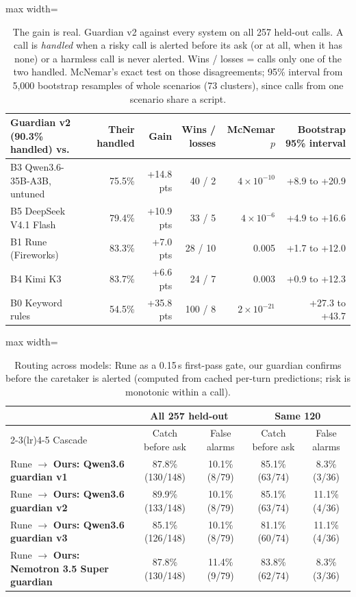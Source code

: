 \documentclass[11pt]{article}
\begin{document}
\begin{table}[H]\centering\small
\caption{The gain is real. Guardian v2 against every system on all 257 held-out calls. A call is \emph{handled} when a risky call is alerted before its ask (or at all, when it has none) or a harmless call is never alerted. Wins / losses = calls only one of the two handled. McNemar's exact test on those disagreements; 95\% interval from 5,000 bootstrap resamples of whole scenarios (73 clusters), since calls from one scenario share a script.}\label{tab:sig}
\begin{adjustbox}{max width=\linewidth}\begin{tabular}{lrrrrr}\toprule
Guardian v2 (90.3\% handled) vs. & Their handled & Gain & Wins / losses & McNemar $p$ & Bootstrap 95\% interval \\ \midrule
B3 Qwen3.6-35B-A3B, untuned & 75.5\% & +14.8 pts & 40 / 2 & $4\times10^{-10}$ & +8.9 to +20.9 \\
B5 DeepSeek V4.1 Flash & 79.4\% & +10.9 pts & 33 / 5 & $4\times10^{-6}$ & +4.9 to +16.6 \\
B1 Rune (Fireworks) & 83.3\% & +7.0 pts & 28 / 10 & 0.005 & +1.7 to +12.0 \\
B4 Kimi K3 & 83.7\% & +6.6 pts & 24 / 7 & 0.003 & +0.9 to +12.3 \\
B0 Keyword rules & 54.5\% & +35.8 pts & 100 / 8 & $2\times10^{-21}$ & +27.3 to +43.7 \\
\bottomrule\end{tabular}\end{adjustbox}\end{table}

\begin{table}[H]\centering\small
\caption{Routing across models: Rune as a 0.15\,s first-pass gate, our guardian confirms before the caretaker is alerted (computed from cached per-turn predictions; risk is monotonic within a call).}\label{tab:cascade}
\begin{adjustbox}{max width=\linewidth}\begin{tabular}{lcccc}\toprule
& \multicolumn{2}{c}{All 257 held-out} & \multicolumn{2}{c}{Same 120} \\ \cmidrule(lr){2-3}\cmidrule(lr){4-5}
Cascade & Catch before ask & False alarms & Catch before ask & False alarms \\ \midrule
Rune $\rightarrow$ \textbf{Ours: Qwen3.6 guardian v1} & 87.8\% (130/148) & 10.1\% (8/79) & 85.1\% (63/74) & 8.3\% (3/36) \\
Rune $\rightarrow$ \textbf{Ours: Qwen3.6 guardian v2} & 89.9\% (133/148) & 10.1\% (8/79) & 85.1\% (63/74) & 11.1\% (4/36) \\
Rune $\rightarrow$ \textbf{Ours: Qwen3.6 guardian v3} & 85.1\% (126/148) & 10.1\% (8/79) & 81.1\% (60/74) & 11.1\% (4/36) \\
Rune $\rightarrow$ \textbf{Ours: Nemotron 3.5 Super guardian} & 87.8\% (130/148) & 11.4\% (9/79) & 83.8\% (62/74) & 8.3\% (3/36) \\
\bottomrule\end{tabular}\end{adjustbox}\end{table}
\end{document}
